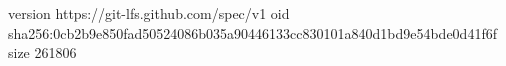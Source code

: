version https://git-lfs.github.com/spec/v1
oid sha256:0cb2b9e850fad50524086b035a90446133cc830101a840d1bd9e54bde0d41f6f
size 261806
